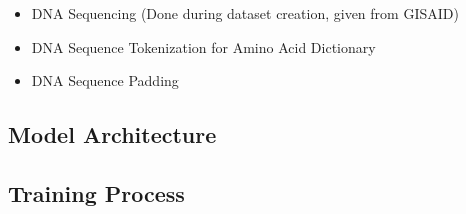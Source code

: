 \begin{itemize}
	\item DNA Sequencing (Done during dataset creation, given from GISAID)
	\item DNA Sequence Tokenization for Amino Acid Dictionary
	\item DNA Sequence Padding
\end{itemize}

\subsection{Model Architecture}  \label{ch:approachC}

\subsection{Training Process} \label{ch:approachD}

\newpage
